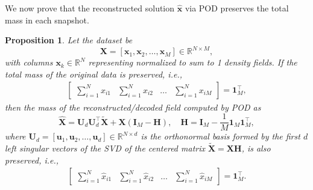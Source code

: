 \documentclass{article}
\newtheorem{prop}{Proposition}
\begin{document}
We now prove that the reconstructed solution $\hat{\mathbf{x}}$ via POD preserves the total mass in each snapshot.
\begin{prop}
\label{prop1}
Let the dataset be 
\begin{equation}
    \mathbf{X} = [\mathbf{x}_1, \mathbf{x}_2, \dots, \mathbf{x}_M] \in \mathbb{R}^{N \times M},
\end{equation}
with columns $\mathbf{x}_k \in \mathbb{R}^{N}$ representing normalized to sum to 1 density fields. If the total mass of the original data is preserved, i.e.,
\begin{align}
    \begin{bmatrix}
      \sum_{i=1}^{N} x_{i1} & \sum_{i=1}^{N} x_{i2} & \dots & \sum_{i=1}^{N} x_{iM}
    \end{bmatrix}
    = \mathbf{1}_M^\top,
\end{align}
then the mass of the \textit{reconstructed/decoded} field computed by POD as
\begin{equation}
\hat{\mathbf{X}} = \mathbf{U}_d 
\mathbf{U}_d^\top \tilde{\mathbf{X}} +  \mathbf{X} (\mathbf{I}_M - \mathbf{H}), \quad \mathbf{H} = \mathbf{I}_M - \frac{1}{M} \mathbf{1}_M \mathbf{1}_M^\top,
\label{eq:recon_theorem}
\end{equation}
where $\mathbf{U}_d = [\mathbf{u}_1,\mathbf{u}_2,\dots, \mathbf{u}_d] \in \mathbb{R}^{N \times d}$ is the orthonormal basis formed by the first $d$ left singular vectors of the SVD of the centered matrix $\tilde{\mathbf{X}} = \mathbf{X} \mathbf{H}$, is also preserved, i.e.,
\begin{align}
    \begin{bmatrix}
      \sum_{i=1}^{N} \hat{x}_{i1} & \sum_{i=1}^{N} \hat{x}_{i2} & \dots & \sum_{i=1}^{N} \hat{x}_{iM}
    \end{bmatrix}
    = \mathbf{1}_M^\top.
\end{align}
\end{prop}
\end{document}
